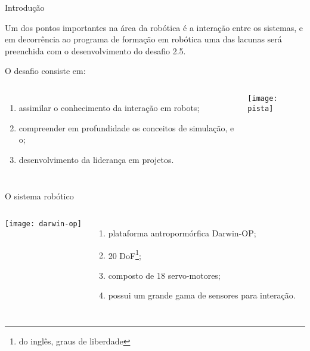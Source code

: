\begin{frame}[t]{Introdução} 
    
    \transdissolve[duration=0.5]
    Um dos pontos importantes na área da robótica é a interação entre os sistemas, e em decorrência ao programa de formação em robótica uma das lacunas será preenchida com o desenvolvimento do desafio 2.5.

    O desafio consiste em:
    \newline
        \begin{columns}[c]
                \begin{enumerate}
                    \item assimilar o conhecimento da interação em robots;
                    \item compreender em profundidade os conceitos de simulação, e o;
                    \item desenvolvimento da liderança em projetos.
                \end{enumerate}
                \texttt{[image: pista]}
        \end{columns}
\end{frame}
\begin{frame}[t]{O sistema robótico}
    \transboxout[duration=0.5]
    \begin{columns}
            \texttt{[image: darwin-op]}
            \begin{enumerate}
                \item plataforma antropormórfica Darwin-OP;
                \item 20 DoF\footnote{do inglês, graus de liberdade};
                \item composto de 18 servo-motores;
                \item possui um grande gama de sensores para interação.
            \end{enumerate}
    \end{columns}
\end{frame}
